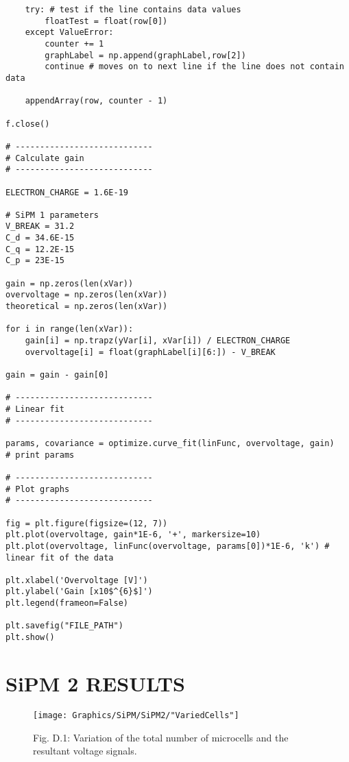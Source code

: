\begin{lstlisting}
    try: # test if the line contains data values
        floatTest = float(row[0])
    except ValueError:
        counter += 1
        graphLabel = np.append(graphLabel,row[2])
        continue # moves on to next line if the line does not contain data

    appendArray(row, counter - 1)

f.close()

# ----------------------------
# Calculate gain
# ----------------------------

ELECTRON_CHARGE = 1.6E-19

# SiPM 1 parameters
V_BREAK = 31.2
C_d = 34.6E-15
C_q = 12.2E-15
C_p = 23E-15

gain = np.zeros(len(xVar))
overvoltage = np.zeros(len(xVar))
theoretical = np.zeros(len(xVar))

for i in range(len(xVar)):
    gain[i] = np.trapz(yVar[i], xVar[i]) / ELECTRON_CHARGE
    overvoltage[i] = float(graphLabel[i][6:]) - V_BREAK

gain = gain - gain[0]

# ----------------------------
# Linear fit
# ----------------------------

params, covariance = optimize.curve_fit(linFunc, overvoltage, gain)
# print params

# ----------------------------
# Plot graphs
# ----------------------------

fig = plt.figure(figsize=(12, 7))
plt.plot(overvoltage, gain*1E-6, '+', markersize=10)
plt.plot(overvoltage, linFunc(overvoltage, params[0])*1E-6, 'k') # linear fit of the data

plt.xlabel('Overvoltage [V]')
plt.ylabel('Gain [x10$^{6}$]')
plt.legend(frameon=False)

plt.savefig("FILE_PATH")
plt.show()

\end{lstlisting}

\newpage

\section{SiPM 2 RESULTS}

\begin{figure}[h]
  \centering
  \texttt{[image: Graphics/SiPM/SiPM2/"VariedCells"]}
  {\caption*{Fig. D.1: Variation of the total number of microcells and the resultant voltage signals.}}
\end{figure}

